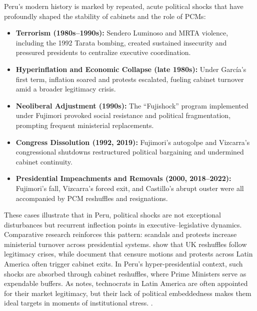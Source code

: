 \documentclass[a4paper, 12pt]{article}
\begin{document}
Peru’s modern history is marked by repeated, acute political shocks that have profoundly shaped the stability of cabinets and the role of PCMs:

\begin{itemize}
  \item \textbf{Terrorism (1980s–1990s):} Sendero Luminoso and MRTA violence, including the 1992 Tarata bombing, created sustained insecurity and pressured presidents to centralize executive coordination.
  \item \textbf{Hyperinflation and Economic Collapse (late 1980s):} Under García’s first term, inflation soared and protests escalated, fueling cabinet turnover amid a broader legitimacy crisis.
  \item \textbf{Neoliberal Adjustment (1990s):} The ``Fujishock'' program implemented under Fujimori provoked social resistance and political fragmentation, prompting frequent ministerial replacements.
  \item \textbf{Congress Dissolution (1992, 2019):} Fujimori's autogolpe and Vizcarra’s congressional shutdowns restructured political bargaining and undermined cabinet continuity.
  \item \textbf{Presidential Impeachments and Removals (2000, 2018–2022):} Fujimori’s fall, Vizcarra’s forced exit, and Castillo’s abrupt ouster were all accompanied by PCM reshuffles and resignations.
\end{itemize}

These cases illustrate that in Peru, political shocks are not exceptional disturbances but recurrent inflection points in executive–legislative dynamics. Comparative research reinforces this pattern: scandals and protests increase ministerial turnover across presidential systems. \citet{dewan_corrective_2005} show that UK reshuffles follow legitimacy crises, while \citet{camerlo_minister_2015-1} document that censure motions and protests across Latin America often trigger cabinet exits. In Peru’s hyper-presidential context, such shocks are absorbed through cabinet reshuffles, where Prime Ministers serve as expendable buffers. As \citet[pp.~7--9]{dargent_technocracy_2014} notes, technocrats in Latin America are often appointed for their market legitimacy, but their lack of political embeddedness makes them ideal targets in moments of institutional stress.
.
\end{document}
